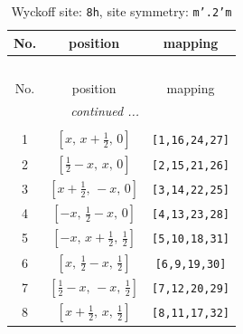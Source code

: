 \documentclass[fleqn,8pt]{jsarticle}
\begin{document}
\begin{longtable}{ccc}
\caption{Wyckoff site: {\tt 8h}, site symmetry: {\tt m'.2'm}}
 \\
 \hline \hline
No. & position & mapping \\ \hline \endfirsthead

\multicolumn{2}{l}{\tablename\ \thetable{}} \\
 \hline \hline
No. & position & mapping \\ \hline \endhead

 \hline \hline
\multicolumn{2}{r}{\footnotesize\it continued ...} \\ \endfoot

 \hline \hline
\multicolumn{2}{r}{} \\ \endlastfoot

1 & $\left[ x,\, x + \frac{1}{2},\, 0 \right]$ & {\tt [1,16,24,27]} \\ \hline
2 & $\left[ \frac{1}{2} - x,\, x,\, 0 \right]$ & {\tt [2,15,21,26]} \\ \hline
3 & $\left[ x + \frac{1}{2},\, - x,\, 0 \right]$ & {\tt [3,14,22,25]} \\ \hline
4 & $\left[ - x,\, \frac{1}{2} - x,\, 0 \right]$ & {\tt [4,13,23,28]} \\ \hline
5 & $\left[ - x,\, x + \frac{1}{2},\, \frac{1}{2} \right]$ & {\tt [5,10,18,31]} \\ \hline
6 & $\left[ x,\, \frac{1}{2} - x,\, \frac{1}{2} \right]$ & {\tt [6,9,19,30]} \\ \hline
7 & $\left[ \frac{1}{2} - x,\, - x,\, \frac{1}{2} \right]$ & {\tt [7,12,20,29]} \\ \hline
8 & $\left[ x + \frac{1}{2},\, x,\, \frac{1}{2} \right]$ & {\tt [8,11,17,32]} \\
\end{longtable}
\renewcommand{\arraystretch}{1.2}
\end{document}

